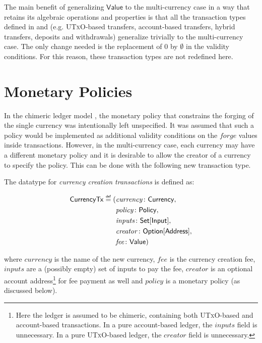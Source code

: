 \documentclass{llncs}
\newcommand{\defeq}{\mathrel{\overset{\makebox[0pt]{\mbox{\normalfont\tiny\sffamily def}}}{=}}}
\newcommand{\utxo}{\textsc{UTxO}\xspace}
\newcommand{\type}[1]{\mathsf{#1}}
\newcommand{\setT}{\type{Set}}
\newcommand{\maybeT}{\type{Option}}
\newcommand{\currencyCreationT}{\type{CurrencyTx}}
\newcommand{\inputT}{\type{Input}}
\newcommand{\addressT}{\type{Address}}
\newcommand{\valueT}{\type{Value}}
\newcommand{\currencyT}{\type{Currency}}
\newcommand{\policyT}{\type{Policy}}
\newcommand{\field}[1]{\mathit{#1}}
\newcommand{\ins}{\field{inputs}}
\newcommand{\forge}{\field{forge}}
\newcommand{\fee}{\field{fee}}
\newcommand{\policy}{\field{policy}}
\newcommand{\creator}{\field{creator}}
\newcommand{\currency}{\field{currency}}
\newenvironment{smallish}{
	\begin{small}
}{
	\end{small}
}
\begin{document}
The main benefit of generalizing $\valueT$ to the multi-currency case in a way that retains its algebraic operations and properties is that all the transaction types defined in \cite{ChimericLedgers} and \cite{UTxOScripts} (e.g. \utxo-based transfers, account-based transfers, hybrid transfers, deposits and withdrawals) generalize trivially to the multi-currency case. The only change needed is the replacement of $0$ by $\emptyset$ in the validity conditions. For this reason, these transaction types are not redefined here. 



\section{Monetary Policies}
\label{sec:MonetaryPolicy}

In the chimeric ledger model \cite{ChimericLedgers}, the monetary policy that constrains the forging of the single currency was intentionally left unspecified. It was assumed that such a policy would be implemented as additional validity conditions on the $\forge$ values inside transactions. 
However, in the multi-currency case, each currency may have a different monetary policy and it is desirable to allow the creator of a currency to specify the policy. This can be done with the following new transaction type.

\begin{definition}
\label{def:CurrencyCreation}
The datatype for \emph{currency creation transactions} is defined as:
\begin{smallish}
\begin{equation*}
\begin{split}
\currencyCreationT \defeq (&\currency\colon \currencyT,\\& \policy\colon \policyT,\\& \ins\colon \setT[\inputT],\\& \creator\colon \maybeT[\addressT],\\& \fee\colon \valueT)
\end{split}
\end{equation*}
\end{smallish}
where $\currency$ is the name of the new currency, $\fee$ is the currency creation fee, $\ins$ are a (possibly empty) set of inputs to pay the fee, $\creator$ is an optional account address\footnote{Here the ledger is assumed to be chimeric, containing both \utxo-based and account-based transactions. In a pure account-based ledger, the $\ins$ field is unnecessary. In a pure \utxo-based ledger, the $\creator$ field is unnecessary.} for fee payment as well and $\policy$ is a monetary policy (as discussed below).
\end{definition}
\end{document}
